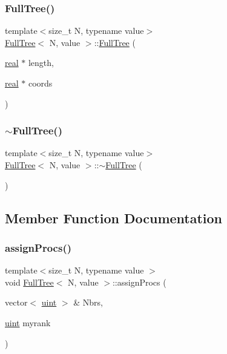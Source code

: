 \subsubsection{\texorpdfstring{Full\+Tree()}{FullTree()}}
{\footnotesize\ttfamily template$<$size\+\_\+t N, typename value$>$ \\
\mbox{\hyperlink{classFullTree}{Full\+Tree}}$<$ N, value $>$\+::\mbox{\hyperlink{classFullTree}{Full\+Tree}} (\begin{DoxyParamCaption}\item[{\mbox{\hyperlink{definitions_8h_aedc0ad84d1e764530814f57ad931d02a}{real}} $\ast$}]{length,  }\item[{\mbox{\hyperlink{definitions_8h_aedc0ad84d1e764530814f57ad931d02a}{real}} $\ast$}]{coords }\end{DoxyParamCaption})\hspace{0.3cm}{\ttfamily [inline]}}

\mbox{\label{classFullTree_a8b2e043f141edee101d55ad0ea497d9f}} 
\subsubsection{\texorpdfstring{$\sim$\+Full\+Tree()}{~FullTree()}}
{\footnotesize\ttfamily template$<$size\+\_\+t N, typename value$>$ \\
\mbox{\hyperlink{classFullTree}{Full\+Tree}}$<$ N, value $>$\+::$\sim$\mbox{\hyperlink{classFullTree}{Full\+Tree}} (\begin{DoxyParamCaption}{ }\end{DoxyParamCaption})\hspace{0.3cm}{\ttfamily [inline]}}



\subsection{Member Function Documentation}
\mbox{\label{classFullTree_a71034640d78c83c761cc005a77f83afa}} 
\subsubsection{\texorpdfstring{assign\+Procs()}{assignProcs()}}
{\footnotesize\ttfamily template$<$size\+\_\+t N, typename value $>$ \\
void \mbox{\hyperlink{classFullTree}{Full\+Tree}}$<$ N, value $>$\+::assign\+Procs (\begin{DoxyParamCaption}\item[{vector$<$ \mbox{\hyperlink{definitions_8h_a69aa29b598b851b0640aa225a9e5d61d}{uint}} $>$ \&}]{Nbrs,  }\item[{\mbox{\hyperlink{definitions_8h_a69aa29b598b851b0640aa225a9e5d61d}{uint}}}]{myrank }\end{DoxyParamCaption})}


